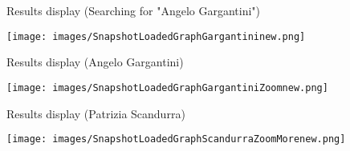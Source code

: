 \documentclass[aspectratio = 169, 15pt, trans]{beamer}
\begin{document}
    \begin{frame}{Results display (Searching for "Angelo Gargantini")}
        \begin{center}
            \vspace*{-0.83cm}
            \hspace*{-1.06cm}
            \texttt{[image: images/SnapshotLoadedGraphGargantininew.png]}
        \end{center}
    \end{frame}
    
    \begin{frame}{Results display (Angelo Gargantini)}
        \begin{center}
            \vspace*{-0.83cm}
            \hspace*{-1.06cm}
            \texttt{[image: images/SnapshotLoadedGraphGargantiniZoomnew.png]}
        \end{center}
    \end{frame}
    
    \begin{frame}{}
    \end{frame}
    
    \begin{frame}{Results display (Patrizia Scandurra)}
        \begin{center}
            \vspace*{-0.83cm}
            \hspace*{-1.06cm}
            \texttt{[image: images/SnapshotLoadedGraphScandurraZoomMorenew.png]}
        \end{center}
    \end{frame}
    
\end{document}
